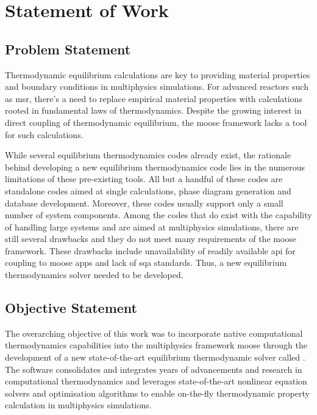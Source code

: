 \chapter{Statement of Work} \label{chap:overview}
	
\section{Problem Statement}
    Thermodynamic equilibrium calculations are key to providing material properties and boundary conditions in multiphysics simulations. For advanced reactors such as \gls{msr}, there's a need to replace empirical material properties with calculations rooted in fundamental laws of thermodynamics.  Despite the growing interest in direct coupling of thermodynamic equilibrium, the \gls{moose} framework lacks a tool for such calculations.

    While several equilibrium thermodynamics codes already exist, the rationale behind developing a new equilibrium thermodynamics code lies in the numerous limitations of these pre-existing tools. All but a handful of these codes are standalone codes aimed at single calculations, phase diagram generation and database development. Moreover, these codes usually support only a small number of system components. Among the codes that do exist with the capability of handling large systems and are aimed at multiphysics simulations, there are still several drawbacks and they do not meet many requirements of the \gls{moose} framework. These drawbacks include unavailability of readily available \gls{api} for coupling to \gls{moose} apps and lack of \gls{sqa} standards. Thus, a new equilibrium thermodynamics solver needed to be developed.

\section{Objective Statement}
    The overarching objective of this work was to incorporate native computational thermodynamics capabilities into the multiphysics framework \gls{moose} through the development of a new state-of-the-art equilibrium thermodynamic solver called \GEM. The software consolidates and integrates years of advancements and research in computational thermodynamics and leverages state-of-the-art nonlinear equation solvers and optimisation algorithms to enable on-the-fly thermodynamic property calculation in multiphysics simulations. 

